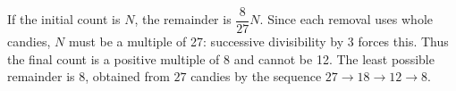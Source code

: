 If the initial count is $ N $, the remainder is $\dfrac{8}{27}N $. Since each removal uses whole candies, $ N $ must be a multiple of 27: successive divisibility by 3 forces this. Thus the final count is a positive multiple of 8 and cannot be 12. The least possible remainder is $\boxed8 $, obtained from $\boxed{27}$ candies by the sequence $ 27\to18\to12\to8 $.
